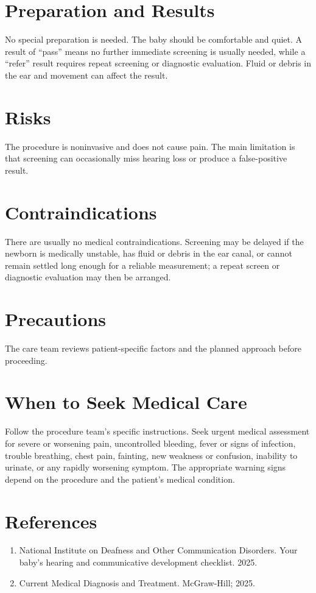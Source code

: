 \section*{Preparation and Results}
No special preparation is needed. The baby should be comfortable and quiet. A result of ``pass'' means no further immediate screening is usually needed, while a ``refer'' result requires repeat screening or diagnostic evaluation. Fluid or debris in the ear and movement can affect the result.

\section*{Risks}
The procedure is noninvasive and does not cause pain. The main limitation is that screening can occasionally miss hearing loss or produce a false-positive result.

\section*{Contraindications}
There are usually no medical contraindications. Screening may be delayed if the newborn is medically unstable, has fluid or debris in the ear canal, or cannot remain settled long enough for a reliable measurement; a repeat screen or diagnostic evaluation may then be arranged.

\section*{Precautions}
The care team reviews patient-specific factors and the planned approach before proceeding.

\section*{When to Seek Medical Care}
Follow the procedure team's specific instructions. Seek urgent medical assessment for severe or worsening pain, uncontrolled bleeding, fever or signs of infection, trouble breathing, chest pain, fainting, new weakness or confusion, inability to urinate, or any rapidly worsening symptom. The appropriate warning signs depend on the procedure and the patient's medical condition.

\section*{References}
\begin{enumerate}
  \item National Institute on Deafness and Other Communication Disorders. Your baby's hearing and communicative development checklist. 2025.
  \item Current Medical Diagnosis and Treatment. McGraw-Hill; 2025.
\end{enumerate}
\clearpage
